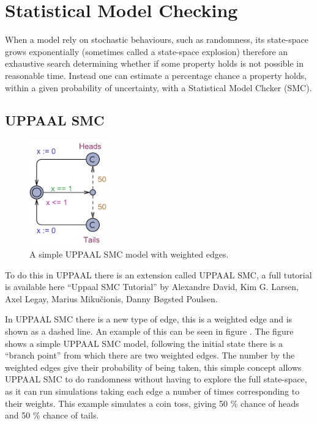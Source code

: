 \newpage
\section{Statistical Model Checking}

When a model rely on stochastic behaviours, such as randomness, its state-space grows exponentially (sometimes called a state-space explosion) therefore an exhaustive search determining whether if some property holds is not possible in reasonable time. 
Instead one can estimate a percentage chance a property holds, within a given probability of uncertainty, with a Statistical Model Chcker (SMC). 

\subsection{UPPAAL SMC}\label{subsec:uppaalsmc}
\begin{figure}
\centering
  \includegraphics[width=0.3\textwidth]{Figures/Model/Simple_SMC.pdf} 
\caption{A simple UPPAAL SMC model with weighted edges. }
\label{fig:simpleSMC}
\end{figure}

To do this in UPPAAL there is an extension called UPPAAL SMC, a full tutorial is available here ``Uppaal SMC Tutorial''\cite{DBLP:journals/sttt/DavidLLMP15} by Alexandre David, Kim G. Larsen, Axel Legay, Marius Miku\v{c}ionis, Danny B\o gsted Poulsen.

In UPPAAL SMC there is a new type of edge, this is a weighted edge and is shown as a dashed line. 
An example of this can be seen in figure . 
The figure shows a simple UPPAAL SMC model, following the initial state there is a ``branch point'' from which there are two weighted edges.
The number by the weighted edges give their probability of being taken, this simple concept allows UPPAAL SMC to do randomness without having to explore the full state-space, as it can run simulations taking each edge a number of times corresponding to their weights. 
This example simulates a coin toss, giving 50 \% chance of heads and 50 \% chance of tails. 


